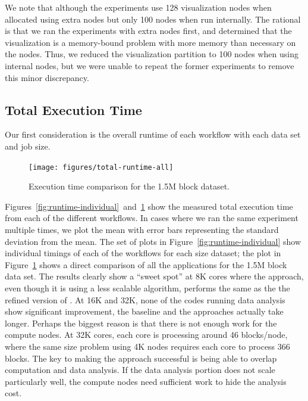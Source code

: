 We note that although the \intransit experiments use 128 visualization
nodes when allocated using extra nodes but only 100 nodes when run internally.
The rational is that we ran the experiments with extra nodes first, and
determined that the visualization is a memory-bound problem with more
memory than necessary on the nodes.  Thus, we reduced the visualization
partition to 100 nodes when using internal nodes, but we were unable to
repeat the former experiments to remove this minor discrepancy.



\subsection{Total Execution Time}
\label{sec:TotalExecutionTime}

Our first consideration is the overall runtime of each workflow with each
data set and job size.

\begin{figure}[htbp]
\begin{centering}
\texttt{[image: figures/total-runtime-all]}
\caption{Execution time comparison for the 1.5M block dataset.}
\label{fig:runtime-total}
\par\end{centering}
\end{figure}

Figures~\ref{fig:runtime-individual}~and~\ref{fig:runtime-total} show the
measured total execution time from each of the different workflows.  In
cases where we ran the same experiment multiple times, we plot the mean
with error bars representing the standard deviation from the mean. The set
of plots in Figure~\ref{fig:runtime-individual} show individual timings of
each of the workflows for each size dataset; the plot in
Figure~\ref{fig:runtime-total} shows a direct comparison of all the
applications for the 1.5M block data set.  The results clearly show a
``sweet spot'' at 8K cores where the \intransit approach, even though it is
using a less scalable algorithm, performs the same as the the refined
version of \insitu.  At 16K and 32K, none of the codes running data
analysis show significant improvement, the baseline \insitu and the
\intransit approaches actually take longer.  Perhaps the biggest reason is
that there is not enough work for the compute nodes.  At 32K cores, each
core is processing around 46 blocks/node, where the same size problem using
4K nodes requires each core to process 366 blocks.  The key to making the
\intransit approach successful is being able to overlap computation and
data analysis.  If the data analysis portion does not scale particularly
well, the compute nodes need sufficient work to hide the analysis cost.

